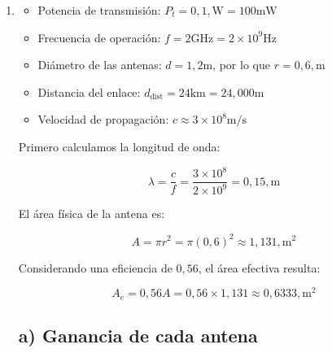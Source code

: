 \documentclass[11pt,a4paper]{article}
\begin{document}
\begin{enumerate}[label=4.\arabic*), itemsep=0.3cm]
        En nuestro caso $G_t=1$ y $G_r=2$. Convertimos esa ganancia a dB:
        $$
          G_r(dB)=10\log(2)
        $$
        $$
          \boxed{G_r=3.01\,dB}
        $$

        Entonces, usando el balance en dB:
        $$
          P_r(dBm)=P_t(dBm)+G_t(dB)+G_r(dB)-L_{dB}
        $$

        Por tanto:
        $$
          P_r=46.99+0+3.01-111.52
        $$
        $$
          \boxed{P_r=-61.52\,dBm}
        $$

  \item
        \begin{itemize}
          \item Potencia de transmisión: $P_t = 0{,}1,\text{W} = 100 \text{mW}$
          \item Frecuencia de operación: $f = 2\text {GHz} = 2 \times 10^9\text{Hz}$
          \item Diámetro de las antenas: $d = 1{,}2 \text{m}$, por lo que $r = 0{,}6,\text{m}$
          \item Distancia del enlace: $d_{\text{dist}} = 24\text {km} = 24,000\text{m}$
          \item Velocidad de propagación: $c \approx 3 \times 10^8\text{m/s}$
        \end{itemize}

        Primero calculamos la longitud de onda:

        \begin{equation}
          \lambda = \frac{c}{f}
          = \frac{3 \times 10^8}{2 \times 10^9}
          = 0{,}15,\text{m}
        \end{equation}

        El área física de la antena es:

        \begin{equation}
          A = \pi r^2
          = \pi(0{,}6)^2
          \approx 1{,}131,\text{m}^2
        \end{equation}

        Considerando una eficiencia de $0{,}56$, el área efectiva resulta:

        \begin{equation}
          A_e = 0{,}56 A
            = 0{,}56 \times 1{,}131
          \approx 0{,}6333,\text{m}^2
        \end{equation}

        \subsection*{a) Ganancia de cada antena}


\end{enumerate}
\end{document}
